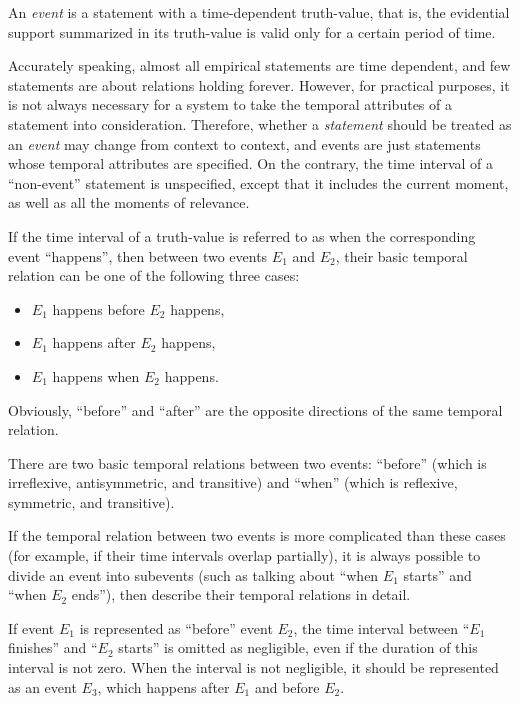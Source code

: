 \begin{defi}
An \emph{event} is a statement with a time-dependent truth-value, that is, the evidential support summarized in its truth-value is valid only for a certain period of time.
\end{defi}

Accurately speaking, almost all empirical statements are time dependent, and few statements are about relations holding forever. However, for practical purposes, it is not always necessary for a system to take the temporal attributes of a statement into consideration. Therefore, whether a \emph{statement} should be treated as an \emph{event} may change from context to context, and events are just statements whose temporal attributes are specified.  On the contrary, the time interval of a ``non-event'' statement is unspecified, except that it includes the current moment, as well as all the moments of relevance. 

If the time interval of a truth-value is referred to as when the corresponding event ``happens'', then between two events $E_1$ and $E_2$, their basic temporal relation can be one of the following three cases:
\begin{itemize}
	\item $E_1$ happens before $E_2$ happens,
	\item $E_1$ happens after $E_2$ happens,
	\item $E_1$ happens when $E_2$ happens.
\end{itemize}
Obviously, ``before'' and ``after'' are the opposite directions of the same temporal relation.

\begin{defi}
There are two basic temporal relations between two events: ``before'' (which is irreflexive, antisymmetric, and transitive) and ``when'' (which is reflexive, symmetric, and transitive).
\end{defi}

If the temporal relation between two events is more complicated than these cases (for example, if their time intervals overlap partially), it is always possible to divide an event into subevents (such as talking about ``when $E_1$ starts'' and ``when $E_2$ ends''), then describe their temporal relations in detail. 

If event $E_1$ is represented as ``before'' event $E_2$, the time interval between ``$E_1$ finishes'' and ``$E_2$ starts'' is omitted as negligible, even if the duration of this interval is not zero. When the interval is not negligible, it should be represented as an event $E_3$, which happens after $E_1$ and before $E_2$.

